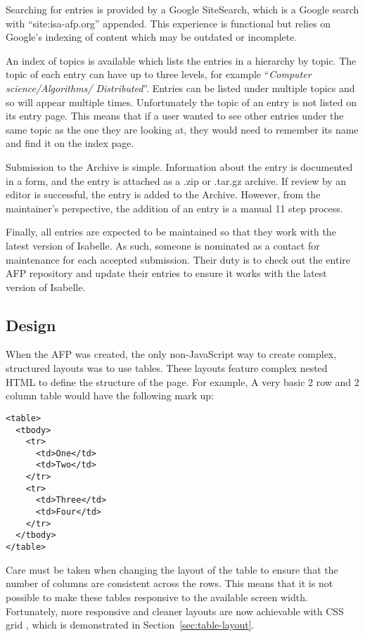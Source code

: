 \documentclass[bsc,frontabs,oneside,singlespacing,parskip,deptreport,logo]{infthesis}
\newcommand{\jtodo}[2][]{\todo[color=yellow!70,#1]{\footnotesize JF: #2}}
\newcommand{\cit}{\jtodo{Citation needed.}}
\begin{document}
Searching for entries is provided by a Google SiteSearch, which is a Google search with ``site:isa-afp.org'' appended. This experience is functional but relies on Google's indexing of content which may be outdated or incomplete. 

An index of topics is available which lists the entries in a hierarchy by topic. The topic of each entry can have up to three levels, for example ``\textit{Computer science/Algorithms/ Distributed}''. Entries can be listed under multiple topics and so will appear multiple times. Unfortunately the topic of an entry is not listed on its entry page. This means that if a user wanted to see other entries under the same topic as the one they are looking at, they would need to remember its name and find it on the index page.

Submission to the Archive is simple. Information about the entry is documented in a form, and the entry is attached as a .zip or .tar.gz archive. If review by an editor is successful, the entry is added to the Archive. However, from the maintainer's perspective, the addition of an entry is a manual 11 step process. 

Finally, all entries are expected to be maintained so that they work with the latest version of Isabelle. As such, someone is nominated as a contact for maintenance for each accepted submission. Their duty is to check out the entire AFP repository and update their entries to ensure it works with the latest version of Isabelle. 

\subsection{Design}
\cbstart
When the AFP was created, the only non-JavaScript way to create complex, structured layouts was to use tables. These layouts feature complex nested HTML to define the structure of the page. For example, A very basic 2 row and 2 column table would have the following mark up:
\cbend

{\footnotesize
\begin{verbatim}
<table>
  <tbody>
    <tr>
      <td>One</td>
      <td>Two</td>
    </tr>
    <tr>
      <td>Three</td>
      <td>Four</td>
    </tr>
  </tbody>
</table>
\end{verbatim}
}
\cbstart
Care must be taken when changing the layout of the table to ensure that the number of columns are consistent across the rows. This means that it is not possible to make these tables responsive to the available screen width. Fortunately, more responsive and cleaner layouts are now achievable with CSS grid \cit{}, which is demonstrated in Section~\ref{sec:table-layout}.
\end{document}
